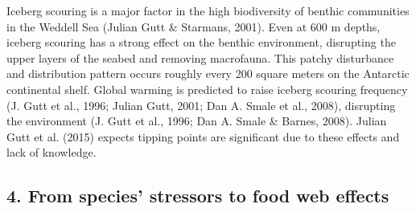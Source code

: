 \documentclass[
]{article}
\begin{document}
Iceberg scouring is a major factor in the high biodiversity of benthic
communities in the Weddell Sea (Julian Gutt \& Starmans, 2001). Even at
600 m depths, iceberg scouring has a strong effect on the benthic
environment, disrupting the upper layers of the seabed and removing
macrofauna. This patchy disturbance and distribution pattern occurs
roughly every 200 square meters on the Antarctic continental shelf.
Global warming is predicted to raise iceberg scouring frequency (J. Gutt
et al., 1996; Julian Gutt, 2001; Dan A. Smale et al., 2008), disrupting
the environment (J. Gutt et al., 1996; Dan A. Smale \& Barnes, 2008).
Julian Gutt et al. (2015) expects tipping points are significant due to
these effects and lack of knowledge.

\hypertarget{from-species-stressors-to-food-web-effects}{%
\subsection{4. From species' stressors to food web
effects}\label{from-species-stressors-to-food-web-effects}}
\end{document}
